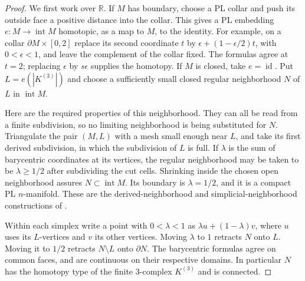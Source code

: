 \begin{proof}
We first work over $\mathbb R$. If $M$ has boundary, choose a PL collar
and push its outside face a positive distance into the collar. This
gives a PL embedding $e:M\longrightarrow\operatorname{int}M$
homotopic, as a map to $M$, to the identity. For example, on a collar
$\partial M\times[0,2]$ replace its second coordinate $t$ by
$\epsilon+(1-\epsilon/2)t$, with $0<\epsilon<1$, and leave the
complement of the collar fixed. The formulas agree at $t=2$;
replacing $\epsilon$ by $s\epsilon$ supplies the homotopy.
If $M$ is closed, take $e=\operatorname{id}$.
Put $L=e(|K^{(3)}|)$ and choose a sufficiently small closed regular
neighborhood $N$ of $L$ in $\operatorname{int}M$.

Here are the required properties of this neighborhood. They can all
be read from a finite subdivision, so no limiting neighborhood is
being substituted for $N$. Triangulate the pair $(M,L)$ with a mesh
small enough near $L$, and take its first derived subdivision, in
which the subdivision of $L$ is full.
If $\lambda$ is the sum of barycentric coordinates at its vertices,
the regular neighborhood may be taken to be $\lambda\geq1/2$ after
subdividing the cut cells. Shrinking inside the chosen open
neighborhood assures $N\subset\operatorname{int}M$. Its boundary
is $\lambda=1/2$, and it is a compact PL $n$-manifold. These are
the derived-neighborhood and simplicial-neighborhood constructions
of \cite[Chapter~3, Proposition~3.10 and Theorem~3.11, pp.~34--35,
and Corollary~3.18, p.~36]
{RourkeSanderson1972}.

Within each simplex write a point with $0<\lambda<1$ as
$\lambda u+(1-\lambda)v$, where $u$ uses its $L$-vertices and
$v$ its other vertices. Moving $\lambda$ to $1$ retracts $N$ onto
$L$. Moving it to $1/2$ retracts $N\setminus L$ onto $\partial N$.
The barycentric formulas agree on common faces, and are continuous
on their respective domains. In particular $N$ has the homotopy
type of the finite $3$-complex $K^{(3)}$ and is connected.


\end{proof}
